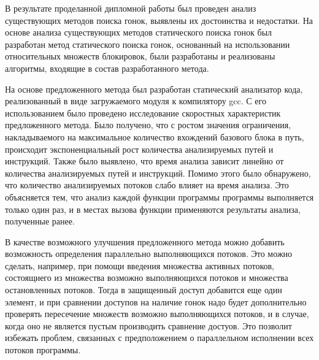 \Conclusion

В результате проделанной дипломной работы был проведен анализ существующих методов поиска гонок, выявлены их достоинства и недостатки. На основе анализа существующих методов статического поиска гонок был разработан метод статического поиска гонок, основанный на использовании относительных множеств блокировок, были разработаны и реализованы алгоритмы, входящие в состав разработанного метода.

На основе предложенного метода был разработан статический анализатор кода, реализованный в виде загружаемого модуля к компилятору gcc. С его использованием было проведено исследование скоростных характеристик предложенного метода. Было получено, что с ростом значения ограничения, накладываемого на максимальное количество вхождений базового блока в путь, происходит экспоненциальный рост количества анализируемых путей и инструкций. Также было выявлено, что время анализа  зависит линейно от количества анализируемых путей и инструкций. Помимо этого было обнаружено, что количество анализируемых  потоков слабо влияет на время анализа. Это объясняется тем, что анализ каждой функции программы программы выполняется только один раз, и в местах вызова функции применяются результаты анализа, полученные ранее.

В качестве возможного улучшения предложенного метода можно добавить возможность определения параллельно выполняющихся потоков. Это можно сделать, например, при помощи введения множества активных потоков, состоящиего из множества возможно выполняющихся потоков и множества остановленных потоков. Тогда в защищенный доступ добавится еще один элемент, и при сравнении доступов на наличие гонок надо будет дополнительно проверять пересечение множеств возможно выполняющихся потоков, и в случае, когда оно не является пустым производить сравнение достуов. Это позволит избежать проблем, связанных с предположением о параллельном исполнении всех потоков программы.
